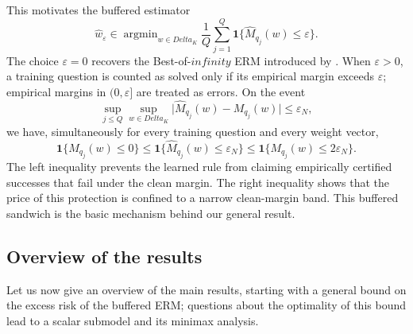 \documentclass[11pt]{article}
\def\infty{infinity}%
\def\Delta{Delta}%
\newcommand{\one}{\mathbf 1}
\newcommand{\eps}{\varepsilon}
\DeclareMathOperator*{\argmin}{argmin}
\begin{document}
This motivates the buffered estimator
\begin{equation}
\label{eq:intro-buffered-estimator}
\widehat w_\eps
\in
\argmin_{w\in\Delta_K}
\frac1Q\sum_{j=1}^Q
\one\{\widehat M_{q_j}(w)\le\eps\}.
\end{equation}
The choice $\eps=0$ recovers the Best-of-$\infty$ ERM introduced by \citet{KomiyamaBoInf}.  When $\eps>0$, a training question is counted as solved only if its empirical margin exceeds $\eps$; empirical margins in $(0,\eps]$ are treated as errors.  On the event
\begin{equation}
\label{eq:intro-uniform-event}
\sup_{j\le Q}\sup_{w\in\Delta_K}
\bigl|\widehat M_{q_j}(w)-M_{q_j}(w)\bigr|
\le\eps_N,
\end{equation}
we have, simultaneously for every training question and every weight vector,
\begin{equation}
\label{eq:intro-sandwich}
\one\{M_{q_j}(w)\le0\}
\le
\one\{\widehat M_{q_j}(w)\le\eps_N\}
\le
\one\{M_{q_j}(w)\le2\eps_N\}.
\end{equation}
The left inequality prevents the learned rule from claiming empirically certified successes that fail under the clean margin.  The right inequality shows that the price of this protection is confined to a narrow clean-margin band.  This buffered sandwich is the basic mechanism behind our general result.

\subsection{Overview of the results}

Let us now give an overview of the main results, starting with a general bound on the excess risk of the buffered ERM; questions about the optimality of this bound lead to a scalar submodel and its minimax analysis.
\end{document}
